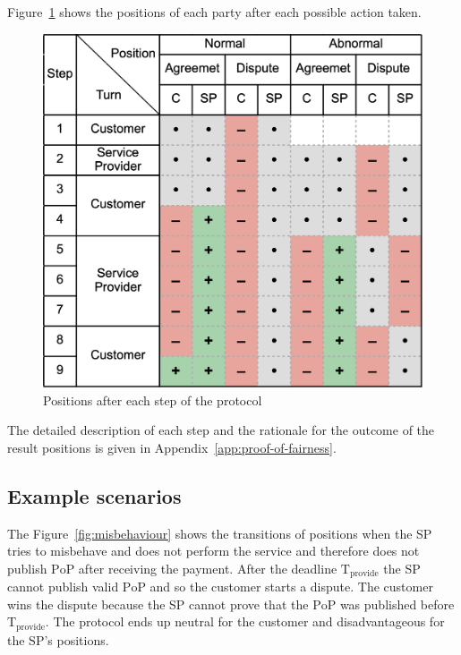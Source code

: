 \documentclass[pdftex,twocolumn,epjc3]{svjour3}
\begin{document}
{Figure~\ref{fig:positions} shows the positions of each party after each possible action taken.

\begin{figure}[h!]
\includegraphics[width=\linewidth]{model.png}
\centering
\caption{Positions after each step of the protocol}
\label{fig:positions}
\end{figure}

The detailed description of each step and the rationale for the outcome of the result positions is given in Appendix~\ref{app:proof-of-fairness}.

\subsection{Example scenarios}\label{example-scenarios}
The Figure~\ref{fig:misbehaviour} shows the transitions of positions when the SP tries to misbehave and does not perform the service and therefore does not publish $\mathrm{PoP}$ after receiving the payment. After the deadline $\mathrm{T}_\mathrm{provide}$ the SP cannot publish valid $\mathrm{PoP}$ and so the customer starts a dispute. The customer wins the dispute because the SP cannot prove that the $\mathrm{PoP}$ was published before $\mathrm{T}_\mathrm{provide}$. The protocol ends up neutral for the customer and disadvantageous for the SP's positions.

}
\end{document}
